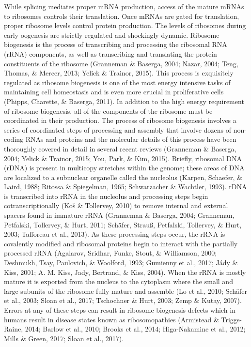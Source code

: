 \documentclass[12pt,oneside]{reedthesis}
\begin{document}
While splicing mediates proper mRNA production, access of the mature
mRNAs to ribosomes controls their translation. Once mRNAs are gated for
translation, proper ribosome levels control protein production. The
levels of ribosomes during early oogenesis are strictly regulated and
shockingly dynamic. Ribosome biogenesis is the process of transcribing
and processing the ribosomal RNA (rRNA) components, as well as
transcribing and translating the protein constituents of the ribosome
(Granneman \& Baserga, 2004; Nazar, 2004; Teng, Thomas, \& Mercer, 2013; Yelick \& Trainor, 2015). This
process is exquisitely regulated as ribosome biogenesis is one of the
most energy intensive tasks of maintaining cell homeostasis and is even
more crucial in proliferative cells (Phipps, Charette, \& Baserga, 2011). In addition to
the high energy requirement of ribosome biogenesis, all of the
components of the ribosome must be coordinated in their production. The
process of ribosome biogenesis involves a series of coordinated steps of
processing and assembly that involve dozens of non-coding RNAs and
proteins and the molecular details of this process have been thoroughly
covered in detail in several recent reviews (Granneman \& Baserga, 2004; Yelick \& Trainor, 2015; You, Park, \& Kim, 2015). Briefly, ribosomal DNA (rDNA) is present in
multicopy stretches within the genome; these areas of DNA are localized
to a subnuclear organelle called the nucleolus (Karpen, Schaefer, \& Laird, 1988; Ritossa \& Spiegelman, 1965; Schwarzacher \& Wachtler, 1993). rDNA is transcribed into rRNA in
the nucleolus and processing steps begin cotranscriptionally
(Koš \& Tollervey, 2010) to remove internal and external spacers found in immature
rRNA (Granneman \& Baserga, 2004; Granneman, Petfalski, Tollervey, \& Hurt, 2011; Schäfer, Strauß, Petfalski, Tollervey, \& Hurt, 2003; Tafforeau et al., 2013). As these processing steps occur, the rRNA is
covalently modified and ribosomal proteins begin to interact with the
partially processed rRNA (Agalarov, Sridhar, Funke, Stout, \& Williamson, 2000; Deshmukh, Tsay, Paulovich, \& Woolford, 1993; Gumienny et al., 2017; Jády \& Kiss, 2001; A. M. Kiss, Jady, Bertrand, \& Kiss, 2004). When the rRNA is mostly
mature it is exported from the nucleus to the cytoplasm where the small
and large subunits of the ribosome fully mature and assemble
(Lo et al., 2010; Schäfer et al., 2003; Sloan et al., 2017; Tschochner \& Hurt, 2003; Zemp \& Kutay, 2007). Errors at any of these steps can result in ribosome
biogenesis defects which in humans result in disease states known as
ribosomopathies (Armistead \& Triggs-Raine, 2014; Barlow et al., 2010; Brooks et al., 2014; Higa-Nakamine et al., 2012; Mills \& Green, 2017; Sloan et al., 2017).
\end{document}
